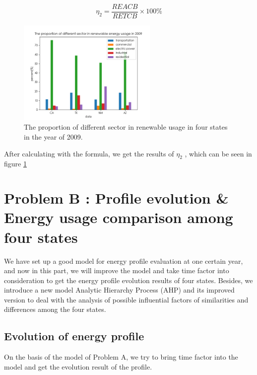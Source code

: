 \documentclass[a4paper,11pt]{article}
\begin{document}
\begin{equation}
    \eta_2=\frac{REACB}{RETCB} \times 100\%
\end{equation}

\begin{figure}[h]%
    \centering 
    \includegraphics[width=0.6\textwidth]{./Pic/1-3.png}
    \caption{The proportion of different sector in renewable usage in four states in the year of 2009.}
    \label{fig:1-3}  
\end{figure}
\par After calculating with the formula, we get the results of $\eta_2$ , which can be seen in figure \ref{fig:1-3}






\section{Problem B : Profile evolution \& Energy usage comparison among four states}

\par We have set up a good model for energy profile evaluation at one certain year, and now in this part, we will improve the model and take time factor into consideration to get the energy profile evolution results of four states. Besides,
we introduce a new model Analytic Hierarchy Process (AHP) and its improved version to deal with the analysis of possible influential factors of similarities and differences among the four states.

\subsection{Evolution of energy profile}
\par On the basis of the model of Problem A, we try to bring time factor into the model and get the evolution result of the profile. 
\end{document}
